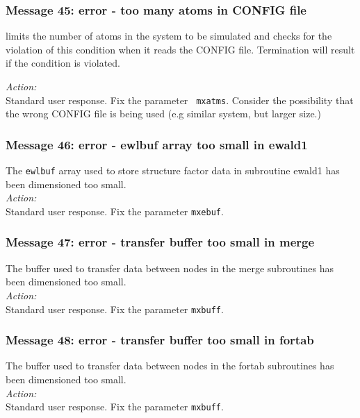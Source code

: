 \subsubsection*{Message 45: error - too many atoms in CONFIG file}

\D{} limits the number of atoms in the system to be simulated and
checks for the violation of this condition when it reads the CONFIG
file. Termination will result if the condition is violated. 

\noindent
{\em Action:} \\ Standard user response. Fix the parameter {\tt
mxatms}.  Consider the possibility that the wrong CONFIG file is being
used (e.g similar system, but larger size.)

\subsubsection*{Message 46: error - ewlbuf array too small in ewald1}

The {\tt ewlbuf} array used to store structure factor data in
subroutine {\sc ewald1} has been dimensioned too small.\\

\noindent
{\em Action:}\\ Standard user response. Fix the parameter {\tt mxebuf}.

\subsubsection*{Message 47: error - transfer buffer too small in merge}

The buffer used to transfer data between nodes in the {\sc merge}
subroutines has been dimensioned too small.\\

\noindent
{\em Action:}\\ Standard user response. Fix the parameter {\tt mxbuff}.

\subsubsection*{Message 48: error - transfer buffer too small in fortab}

The buffer used to transfer data between nodes in the {\sc fortab}
subroutines has been dimensioned too small.\\

\noindent
{\em Action:}\\ Standard user response. Fix the parameter {\tt mxbuff}.


